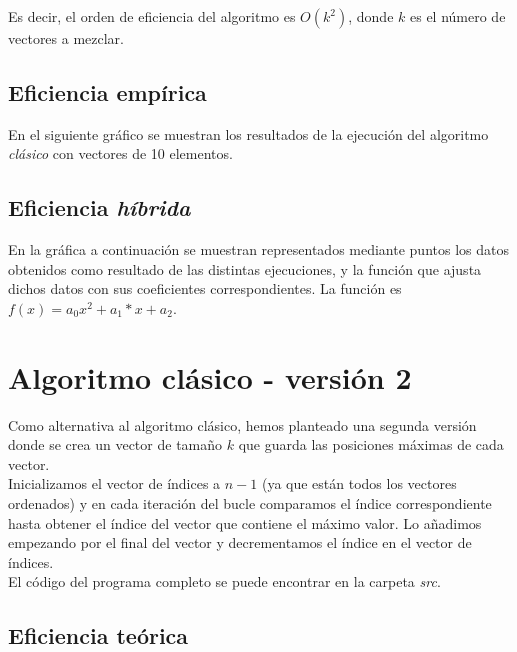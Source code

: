 \documentclass[11pt]{article}
\begin{document}
Es decir, el orden de eficiencia del algoritmo es $O(k^2)$, donde $k$ es el número de vectores a mezclar.

\subsection*{Eficiencia empírica}

En el siguiente gráfico se muestran los resultados de la
ejecución del algoritmo \textit{clásico} con vectores de 10 elementos.
\enlargethispage{5\baselineskip}
\begin{center}
	
\end{center}

\subsection*{Eficiencia \textit{híbrida}}
En la gráfica a continuación se muestran representados mediante puntos los datos obtenidos como resultado de las distintas ejecuciones, y la función que ajusta dichos datos con sus coeficientes correspondientes. La función es $f(x) = a_{0}x^{2}+a_{1}*x + a_{2}$.
\begin{center}
	
\end{center}

\section*{Algoritmo clásico - versión 2}
 
 Como alternativa al algoritmo clásico, hemos planteado una segunda versión donde se crea un vector de tamaño $k$ que guarda las posiciones máximas de cada vector.\\
 
Inicializamos el vector de índices a $n - 1$ (ya que están todos los vectores ordenados) y en cada iteración del bucle comparamos el índice correspondiente hasta obtener el índice del vector que contiene el máximo valor. Lo añadimos empezando por el final del vector y decrementamos el índice en el vector de índices. \\
 
 El código del programa completo se puede encontrar en la carpeta \textit{src}.\\
 
 
 
 \subsection*{Eficiencia teórica}
 
\end{document}
